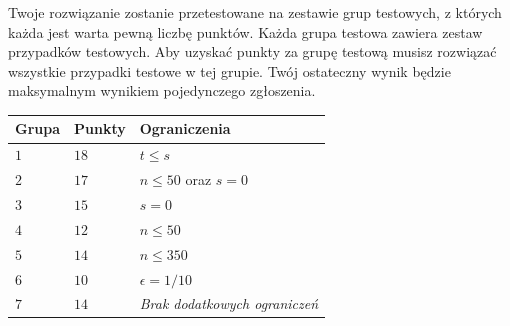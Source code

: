 Twoje rozwiązanie zostanie przetestowane na zestawie grup testowych, z których każda jest warta pewną liczbę punktów.
Każda grupa testowa zawiera zestaw przypadków testowych.
Aby uzyskać punkty za grupę testową musisz rozwiązać wszystkie przypadki testowe w tej grupie.
Twój ostateczny wynik będzie maksymalnym wynikiem pojedynczego zgłoszenia.

\medskip
\noindent
\begin{tabular}{lll}
 Grupa & Punkty & Ograniczenia\\\hline
  $1$ & $18$ &  $t\leq s$\\
  $2$ & $17$ & $n\le 50$ oraz $s=0$\\
  $3$ & $15$ & $s=0$\\
  $4$ & $12$ & $n\leq 50$\\
  $5$ & $14$ & $n\leq 350$\\
  $6$ & $10$ & $\epsilon = 1/10$\\
  $7$ & $14$ & \emph{Brak dodatkowych ograniczeń}\\
\end{tabular}

